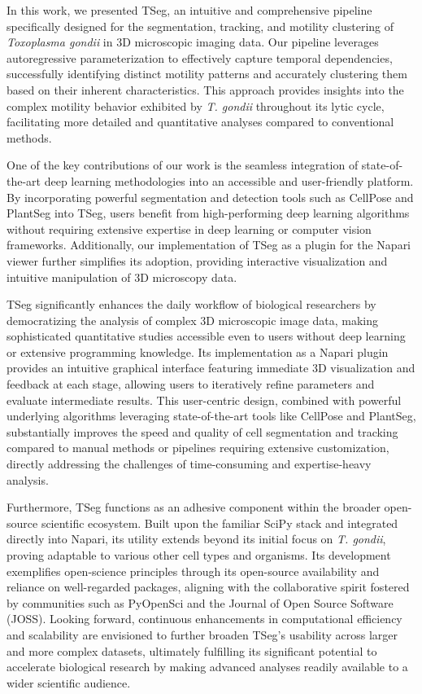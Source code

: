 \documentclass[./dissertation.tex]{subfiles}
\begin{document}
In this work, we presented TSeg, an intuitive and comprehensive pipeline specifically designed for the segmentation, tracking, and motility clustering of \textit{Toxoplasma gondii} in 3D microscopic imaging data. Our pipeline leverages autoregressive parameterization to effectively capture temporal dependencies, successfully identifying distinct motility patterns and accurately clustering them based on their inherent characteristics. This approach provides insights into the complex motility behavior exhibited by \textit{T. gondii} throughout its lytic cycle, facilitating more detailed and quantitative analyses compared to conventional methods.

One of the key contributions of our work is the seamless integration of state-of-the-art deep learning methodologies into an accessible and user-friendly platform. By incorporating powerful segmentation and detection tools such as CellPose and PlantSeg into TSeg, users benefit from high-performing deep learning algorithms without requiring extensive expertise in deep learning or computer vision frameworks. Additionally, our implementation of TSeg as a plugin for the Napari viewer further simplifies its adoption, providing interactive visualization and intuitive manipulation of 3D microscopy data.

TSeg significantly enhances the daily workflow of biological researchers by democratizing the analysis of complex 3D microscopic image data, making sophisticated quantitative studies accessible even to users without deep learning or extensive programming knowledge. Its implementation as a Napari plugin provides an intuitive graphical interface featuring immediate 3D visualization and feedback at each stage, allowing users to iteratively refine parameters and evaluate intermediate results. This user-centric design, combined with powerful underlying algorithms leveraging state-of-the-art tools like CellPose and PlantSeg, substantially improves the speed and quality of cell segmentation and tracking compared to manual methods or pipelines requiring extensive customization, directly addressing the challenges of time-consuming and expertise-heavy analysis.

Furthermore, TSeg functions as an adhesive component within the broader open-source scientific ecosystem. Built upon the familiar SciPy stack and integrated directly into Napari, its utility extends beyond its initial focus on \textit{T. gondii}, proving adaptable to various other cell types and organisms. Its development exemplifies open-science principles through its open-source availability and reliance on well-regarded packages, aligning with the collaborative spirit fostered by communities such as PyOpenSci and the Journal of Open Source Software (JOSS). Looking forward, continuous enhancements in computational efficiency and scalability are envisioned to further broaden TSeg's usability across larger and more complex datasets, ultimately fulfilling its significant potential to accelerate biological research by making advanced analyses readily available to a wider scientific audience.
\end{document}
